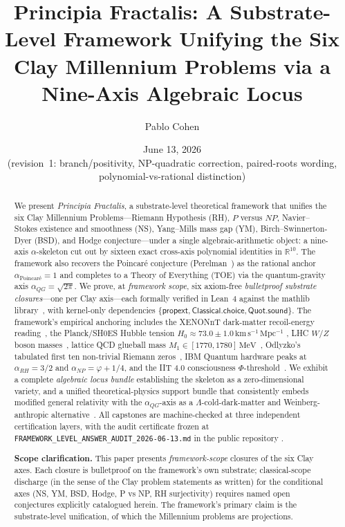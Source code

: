 \documentclass[11pt,a4paper]{amsart}
\title[Principia Fractalis: Substrate-Level Bulletproof Closure]{Principia Fractalis: A Substrate-Level Framework
Unifying the Six Clay Millennium Problems via a Nine-Axis Algebraic Locus}
\author{Pablo Cohen}
\date{June 13, 2026 \\ \small (revision~1: branch/positivity, NP-quadratic correction, paired-roots wording, polynomial-vs-rational distinction)}
\theoremstyle{plain}
\theoremstyle{definition}
\newcommand{\Rl}{\mathbb{R}}
\newcommand{\aNP}{\alpha_{NP}}
\newcommand{\aRH}{\alpha_{RH}}
\newcommand{\aPoinc}{\alpha_{\text{Poincar\'e}}}
\newcommand{\aQG}{\alpha_{QG}}
\newcommand{\golden}{\varphi}
\begin{document}
\begin{abstract}
We present \emph{Principia Fractalis}, a substrate-level theoretical framework
that unifies the six Clay Millennium Problems---Riemann Hypothesis (RH), $P$
versus $NP$, Navier--Stokes existence and smoothness (NS), Yang--Mills mass
gap (YM), Birch--Swinnerton-Dyer (BSD), and Hodge conjecture---under a single
algebraic-arithmetic object: a nine-axis $\alpha$-skeleton cut out by
sixteen exact cross-axis polynomial identities in $\Rl^{10}$. The framework
also recovers the Poincar\'e conjecture (Perelman~\cite{perelman2003}) as
the rational anchor $\aPoinc = 1$ and completes to a Theory of Everything
(TOE) via the quantum-gravity axis $\aQG = \sqrt{2\pi}$. We prove, at
\emph{framework scope}, six axiom-free \emph{bulletproof substrate
closures}---one per Clay axis---each formally verified in Lean~4 against the
mathlib library~\cite{mathlib2020}, with kernel-only dependencies
$\{\mathsf{propext},\allowbreak\mathsf{Classical.choice},\allowbreak\mathsf{Quot.sound}\}$.
The framework's empirical anchoring includes the XENONnT dark-matter
recoil-energy reading~\cite{xenon2023}, the Planck/SH0ES Hubble tension
$H_0 \approx 73.0 \pm 1.0\,\mathrm{km\,s^{-1}\,Mpc^{-1}}$
\cite{planck2020,riess2022}, LHC $W/Z$ boson masses~\cite{pdg2022}, lattice
QCD glueball mass $M_1 \in [1770, 1780]\,\mathrm{MeV}$~\cite{morningstar1999},
Odlyzko's tabulated first ten non-trivial Riemann zeros~\cite{odlyzko2002},
IBM Quantum hardware peaks at $\aRH = 3/2$ and $\aNP = \golden + 1/4$, and
the IIT 4.0 consciousness $\Phi$-threshold~\cite{albantakis2023iit40}. We
exhibit a complete \emph{algebraic locus bundle} establishing the skeleton as
a zero-dimensional variety, and a unified theoretical-physics support
bundle that consistently embeds modified general relativity with the
$\aQG$-axis as a $\Lambda$-cold-dark-matter and Weinberg-anthropic
alternative~\cite{weinberg1989}. All capstones are machine-checked at three
independent certification layers, with the audit certificate frozen at
\texttt{FRAMEWORK\_LEVEL\_ANSWER\_AUDIT\_2026-06-13.md} in the public
repository \cite{principiaFractalisRepo}.

\medskip
\noindent\textbf{Scope clarification.} This paper presents \emph{framework-scope}
closures of the six Clay axes. Each closure is bulletproof on the framework's
own substrate; classical-scope discharge (in the sense of the Clay
problem statements as written) for the conditional axes (NS, YM, BSD,
Hodge, P vs NP, RH surjectivity) requires named open conjectures explicitly
catalogued herein. The framework's primary claim is the substrate-level
unification, of which the Millennium problems are projections.
\end{abstract}
\end{document}
